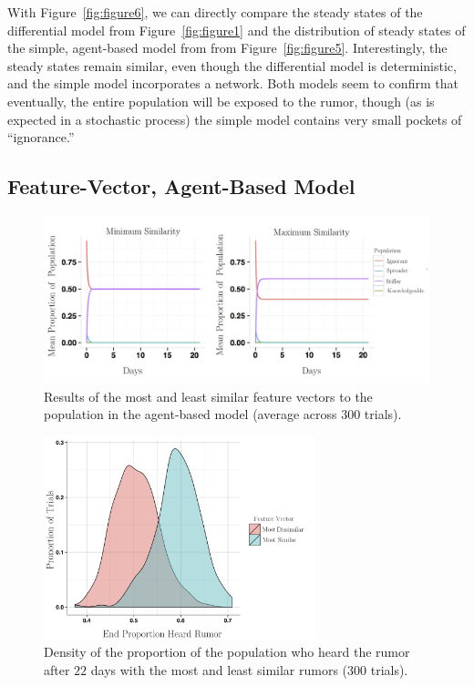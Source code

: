 With Figure~\ref{fig:figure6}, we can directly compare the steady states of the differential model from Figure~\ref{fig:figure1} and the distribution of steady states of the simple, agent-based model from from Figure~\ref{fig:figure5}.
Interestingly, the steady states remain similar, even though the differential model is deterministic, and the simple model incorporates a network.
Both models seem to confirm that eventually, the entire population will be exposed to the rumor, though (as is expected in a stochastic process) the simple model contains very small pockets of ``ignorance.''

\subsection{Feature-Vector, Agent-Based Model}
\label{subsec:featvect}

\begin{figure}[H]
\captionsetup{width=0.8\textwidth}
\centering
    \includegraphics[width=1\textwidth]{figures/figure7}
  \caption{ Results of the most and least similar feature vectors to the population in the agent-based model (average across $ 300 $ trials).}
\label{fig:figure7}
\end{figure}

\begin{figure}[H]
\captionsetup{width=0.8\textwidth}
\centering
    \includegraphics[width=0.7\textwidth]{figures/figure8}
  \caption{ Density of the proportion of the population who heard the rumor after $ 22 $ days with the most and least similar rumors ($ 300 $ trials).}
\label{fig:figure8}
\end{figure}

